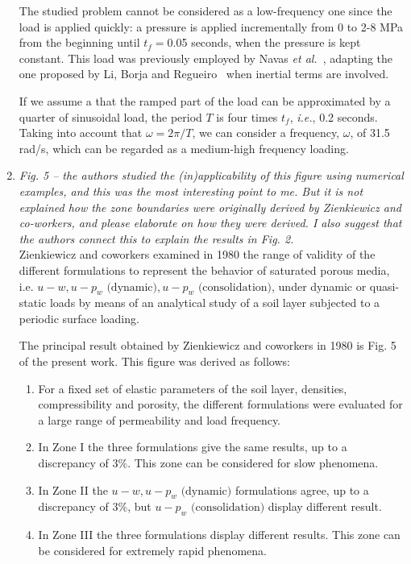\documentclass[12pt]{article}
\begin{document}
\begin{enumerate}
The studied problem cannot be considered as a low-frequency one since the load is applied quickly: a pressure is applied incrementally from 0 to 2-8 MPa from the beginning until $t_f=$0.05 seconds, when the pressure is kept constant. This load was previously employed by Navas \textit{et al.}~\cite{Navas:17b,Navas:17c}, adapting the one proposed by Li, Borja and Regueiro~\cite{LiBorja2004} when inertial terms are involved.

If we assume a that the ramped part of the load can be approximated by a quarter of sinusoidal load, the period $T$ is four times $t_f$, \textit{i.e.}, 0.2 seconds. Taking into account that $\omega=2\pi/T$, we can consider a frequency, $\omega$, of 31.5 rad/s, which can be regarded as a medium-high frequency loading.

\item \textit{Fig. 5 -- the authors studied the (in)applicability of this figure using numerical examples, and this was the most interesting point to me. But it is not explained how the zone boundaries were originally derived by Zienkiewicz and co-workers, and please elaborate on how they were derived. I also suggest that the authors connect this to explain the results in Fig. 2. }\\

Zienkiewicz and coworkers examined in 1980 the range of validity of the different formulations to represent the behavior of saturated porous media, i.e. $u-w, u-p_w \text{ (dynamic)}, u-p_w \text{ (consolidation)}$,  under dynamic or quasi-static loads by means of an analytical study of a soil layer subjected to a periodic surface loading. 

The principal result obtained by Zienkiewicz and coworkers in 1980 is Fig. 5 of the present work. This figure was derived as follows: 

\begin{enumerate}
    \item For a fixed set of elastic parameters of the soil layer, densities, compressibility and porosity, the different formulations were evaluated for a large range of permeability and load frequency.
    \item In Zone I the three formulations give the same results, up to a discrepancy of $3\%$. This zone can be considered for slow phenomena.
    \item In Zone II the $u-w, u-p_w \text{ (dynamic)}$ formulations agree, up to a discrepancy of $3\%$, but $u-p_w \text{ (consolidation)}$ display different result.
    \item In Zone III the three formulations display different results. This zone can be considered for extremely rapid phenomena. 
\end{enumerate}


\end{enumerate}
\end{document}
